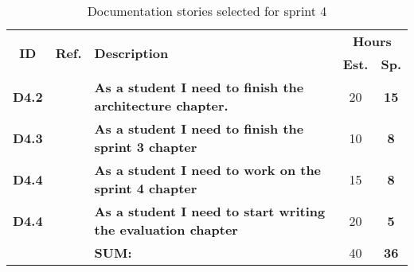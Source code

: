 
 \def\arraystretch{1.25}
 
\begin{longtable}{ccXcc}
  \label{tab:sprint4Documentationstories}\\[-6mm]
  \caption{Documentation stories selected for sprint 4}\\[-4mm]

\toprule[0.5mm]
\multirow{2}{*}{\textbf{ID}} &
\multirow{2}{*}{\textbf{Ref.}} & \multirow{2}{*}{\textbf{Description}} & \multicolumn{2}{c}{\textbf{Hours}} \\
 					& & & \textbf{Est.} & \textbf{Sp.} \\
\midrule


\textbf{D4.2} 	&   & {\bf As a student I need to finish the architecture chapter.} 			& 	20  & \textbf{15} \\
	
\textbf{D4.3} 	&	& {\bf As a student I need to finish the sprint 3 chapter} 					&   10	& \textbf{8} \\

\textbf{D4.4} 	&	& {\bf As a student I need to work on the sprint 4 chapter} 					& 	15 	& \textbf{8} \\

\textbf{D4.4} 	&	& {\bf As a student I need to start writing the evaluation chapter} 				& 	20 	& \textbf{5} \\

\midrule
		
				&	& \textbf{SUM:}		&		40	& \textbf{36}
 \\																			
\bottomrule[0.5mm]
\end{longtable}
